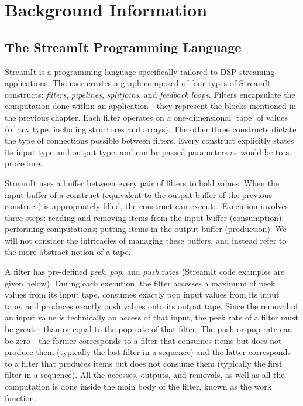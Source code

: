 \chapter{Background Information}

\section{The StreamIt Programming Language}

    StreamIt is a programming language specifically tailored to DSP
streaming applications. The user creates a graph composed of four
types of StreamIt constructs: \textit{filters},
\textit{pipelines}, \textit{splitjoins}, and \textit{feedback
loops}. Filters encapsulate the computation done within an
application - they represent the blocks mentioned in the previous
chapter. Each filter operates on a one-dimensional `tape' of
values (of any type, including structures and arrays).  The other
three constructs dictate the type of connections possible between
filters. Every construct explicitly states its input type and
output type, and can be passed parameters as would be to a
procedure.

    StreamIt uses a buffer between every pair of filters to
hold values. When the input buffer of a construct (equivalent to
the output buffer of the previous construct) is appropriately
filled, the construct can execute. Execution involves three steps:
reading and removing items from the input buffer (consumption);
performing computations; putting items in the output buffer
(production). We will not consider the intricacies of managing
these buffers, and instead refer to the more abstract notion of a
tape.

    A filter has pre-defined \textit{peek}, \textit{pop}, and
\textit{push} rates (StreamIt code examples are given below).
During each execution, the filter accesses a maximum of peek
values from its input tape, consumes exactly pop input values from
its input tape, and produces exactly push values onto its output
tape. Since the removal of an input value is technically an access
of that input, the peek rate of a filter must be greater than or
equal to the pop rate of that filter. The push or pop rate can be
zero - the former corresponds to a filter that consumes items but
does not produce them (typically the last filter in a sequence)
and the latter corresponds to a filter that produces items but
does not consume them (typically the first filter in a sequence).
All the accesses, outputs, and removals, as well as all the
computation is done inside the main body of the filter, known as
the work function.

